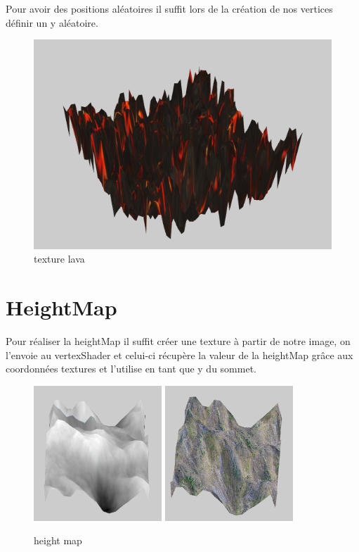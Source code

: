 \documentclass{article}
\begin{document}
Pour avoir des positions aléatoires il suffit lors de la création de nos vertices définir un y aléatoire.

\begin{figure}[h!]
\centerline{ \includegraphics[scale=0.4]{./rendus/rrandom.png} }
\caption{texture lava} 
\end{figure}

\newpage
\section{HeightMap}

Pour réaliser la heightMap il suffit créer une texture à partir de notre image, on l'envoie au vertexShader et celui-ci récupère la valeur de la heightMap grâce aux coordonnées textures et l'utilise en tant que y du sommet.


\begin{figure}[h!]
\centerline{ \includegraphics[scale=1]{./rendus/heightmap2.png} \includegraphics[scale=1]{./rendus/heightmap1.png} }
\caption{height map} 
\end{figure}
\end{document}
